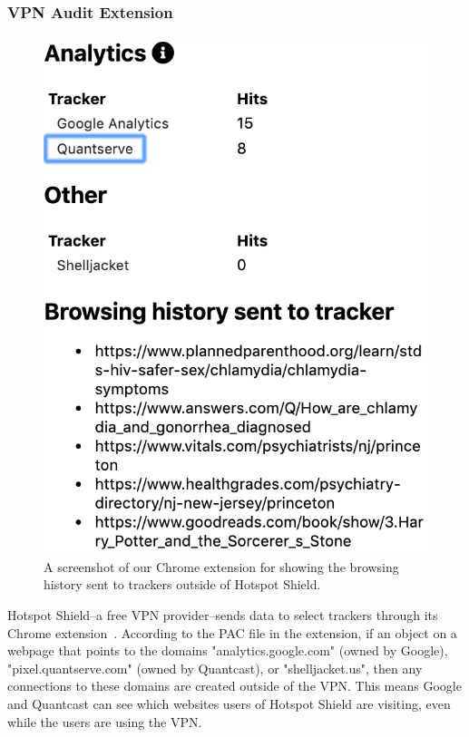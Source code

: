 \subsubsection{VPN Audit Extension}
\begin{figure}[t]
    \includegraphics[width=0.85\linewidth]{sections/figures/vpn-audit.png}
    \caption{A screenshot of our Chrome extension for showing the browsing history sent to trackers outside of Hotspot Shield.}
    \label{fig:vpn-audit}
\end{figure}

Hotspot Shield--a free VPN provider--sends data to select trackers through its Chrome extension~\cite{windscribe-hotspot-shield}.  According to the PAC  file in the extension, if an object on a webpage that points to the domains "analytics.google.com" (owned by Google), "pixel.quantserve.com" (owned by Quantcast), or "shelljacket.us", then any connections to these domains are created outside of the VPN.
 
This means Google and Quantcast can see which websites users of Hotspot Shield are visiting, even while the users are using the VPN. 

